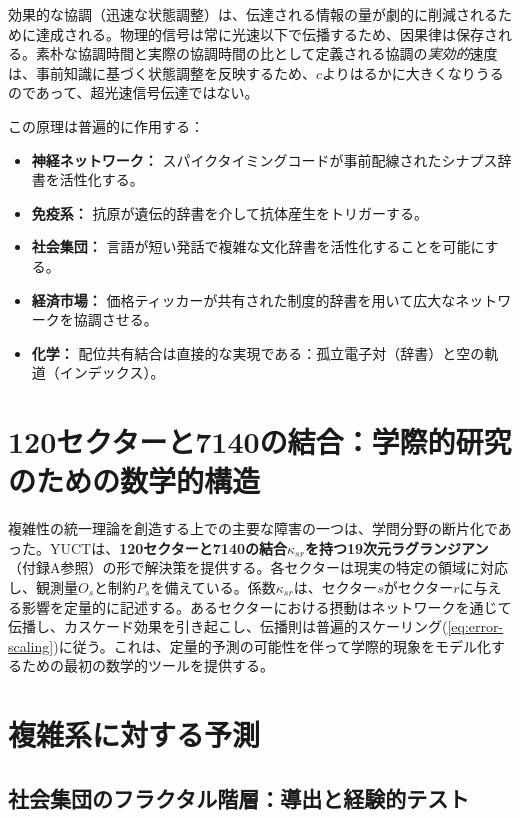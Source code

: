 \documentclass[11pt,a4paper]{article}
\theoremstyle{remark}
\begin{document}
	効果的な協調（迅速な状態調整）は、伝達される情報の量が劇的に削減されるために達成される。物理的信号は常に光速以下で伝播するため、因果律は保存される。素朴な協調時間と実際の協調時間の比として定義される協調の\emph{実効的}速度は、事前知識に基づく状態調整を反映するため、\(c\)よりはるかに大きくなりうるのであって、超光速信号伝達ではない。
	
	この原理は普遍的に作用する：
	\begin{itemize}
		\item \textbf{神経ネットワーク：} スパイクタイミングコードが事前配線されたシナプス辞書を活性化する。
		\item \textbf{免疫系：} 抗原が遺伝的辞書を介して抗体産生をトリガーする。
		\item \textbf{社会集団：} 言語が短い発話で複雑な文化辞書を活性化することを可能にする。
		\item \textbf{経済市場：} 価格ティッカーが共有された制度的辞書を用いて広大なネットワークを協調させる。
		\item \textbf{化学：} 配位共有結合は直接的な実現である：孤立電子対（辞書）と空の軌道（インデックス）。
	\end{itemize}
	
	\section{120セクターと7140の結合：学際的研究のための数学的構造}
	\label{sec:sectors}
	
	複雑性の統一理論を創造する上での主要な障害の一つは、学問分野の断片化であった。YUCTは、\textbf{120セクターと7140の結合\(\kappa_{sr}\)を持つ19次元ラグランジアン}（付録A参照）の形で解決策を提供する。各セクターは現実の特定の領域に対応し、観測量\(O_s\)と制約\(P_s\)を備えている。係数\(\kappa_{sr}\)は、セクター\(s\)がセクター\(r\)に与える影響を定量的に記述する。あるセクターにおける摂動はネットワークを通じて伝播し、カスケード効果を引き起こし、伝播則は普遍的スケーリング(\ref{eq:error-scaling})に従う。これは、定量的予測の可能性を伴って学際的現象をモデル化するための最初の数学的ツールを提供する。
	
	\section{複雑系に対する予測}
	\label{sec:predictions}
	
	\subsection{社会集団のフラクタル階層：導出と経験的テスト}
	\label{sec:social_scaling}
	
\end{document}
